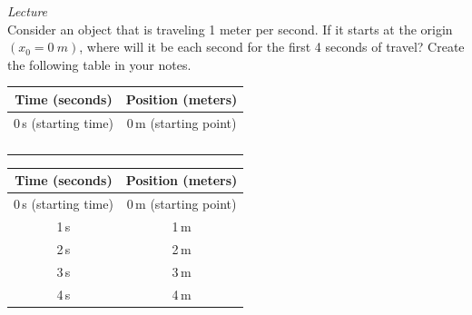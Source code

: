 \documentclass[dvipsnames]{exam}
\begin{document}
\begin{questions}


\question \label{nTMKE}
\textit{Lecture}\\
Consider an object that is traveling 1 meter per second. 
If it starts at the origin $(x_0 = \SI{0}{m})$, where will it be each second for the first 4 seconds of travel? Create the following table in your notes.

\begin{center}
    \begin{tabular}{|c|c|}
        \hline
         \textbf{Time (seconds)} & \textbf{Position (meters)} \\ \hline
         0\,s (starting time) & 0\,m (starting point) \\ \hline
         & \\ \hline
         & \\ \hline
         & \\ \hline
         & \\ \hline
    \end{tabular}
\end{center}

\begin{solution}
    \begin{center}
    \begin{tabular}{|c|c|}
        \hline
         \textbf{Time (seconds)} & \textbf{Position (meters)} \\ \hline
         0\,s (starting time) & 0\,m (starting point) \\ \hline
         1\,s & 1\,m \\ \hline
         2\,s & 2\,m \\ \hline
         3\,s & 3\,m \\  \hline
         4\,s & 4\,m \\ \hline
    \end{tabular}
\end{center}
\end{solution}


\end{questions}
\end{document}
